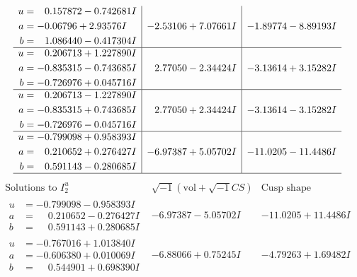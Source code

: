 \documentclass[1p]{elsarticle_modified}
\theoremstyle{definition}
\newcommand{\I}{\sqrt{-1}}
\begin{document}
$$\begin{array}{c|c|c}
\begin{aligned}
u &= \phantom{-}0.157872 - 0.742681 I \\
a &= -0.06796 + 2.93576 I \\
b &= \phantom{-}1.086440 - 0.417304 I\end{aligned}
 & -2.53106 + 7.07661 I & -1.89774 - 8.89193 I \\ \hline\begin{aligned}
u &= \phantom{-}0.206713 + 1.227890 I \\
a &= -0.835315 - 0.743685 I \\
b &= -0.726976 + 0.045716 I\end{aligned}
 & \phantom{-}2.77050 - 2.34424 I & -3.13614 + 3.15282 I \\ \hline\begin{aligned}
u &= \phantom{-}0.206713 - 1.227890 I \\
a &= -0.835315 + 0.743685 I \\
b &= -0.726976 - 0.045716 I\end{aligned}
 & \phantom{-}2.77050 + 2.34424 I & -3.13614 - 3.15282 I \\ \hline\begin{aligned}
u &= -0.799098 + 0.958393 I \\
a &= \phantom{-}0.210652 + 0.276427 I \\
b &= \phantom{-}0.591143 - 0.280685 I\end{aligned}
 & -6.97387 + 5.05702 I & -11.0205 - 11.4486 I\\
 \hline 
 \end{array}$$\newpage$$\begin{array}{c|c|c}  
\text{Solutions to }I^u_{2}& \I (\text{vol} + \sqrt{-1}CS) & \text{Cusp shape}\\
 \hline 
\begin{aligned}
u &= -0.799098 - 0.958393 I \\
a &= \phantom{-}0.210652 - 0.276427 I \\
b &= \phantom{-}0.591143 + 0.280685 I\end{aligned}
 & -6.97387 - 5.05702 I & -11.0205 + 11.4486 I \\ \hline\begin{aligned}
u &= -0.767016 + 1.013840 I \\
a &= -0.606380 + 0.010069 I \\
b &= \phantom{-}0.544901 + 0.698390 I\end{aligned}
 & -6.88066 + 0.75245 I & -4.79263 + 1.69482 I \\ \hline\begin{aligned}

\end{aligned}
\end{array}$$
\end{document}
